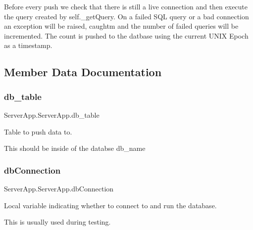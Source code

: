 Before every push we check that there is still a live connection and then execute the query created by self.\+\_\+get\+Query. On a failed S\+QL query or a bad connection an exception will be raised, caughtm and the number of failed queries will be incremented. The count is pushed to the datbase using the current U\+N\+IX Epoch as a timestamp. 

\subsection{Member Data Documentation}
\mbox{\label{class_server_app_1_1_server_app_a759e0eaa4be95b98b3c5be7d7fa2eb6e}} 
\subsubsection{\texorpdfstring{db\+\_\+table}{db\_table}}
{\footnotesize\ttfamily Server\+App.\+Server\+App.\+db\+\_\+table}



Table to push data to. 

This should be inside of the databse db\+\_\+name \mbox{\label{class_server_app_1_1_server_app_a541e00ca3089461e9ee7f02b3a1fdea9}} 
\subsubsection{\texorpdfstring{db\+Connection}{dbConnection}}
{\footnotesize\ttfamily Server\+App.\+Server\+App.\+db\+Connection}



Local variable indicating whether to connect to and run the database. 

This is usually used during testing. \mbox{\label{class_server_app_1_1_server_app_aa3d45986c6c5a318fe81ec68cb794444}} 
